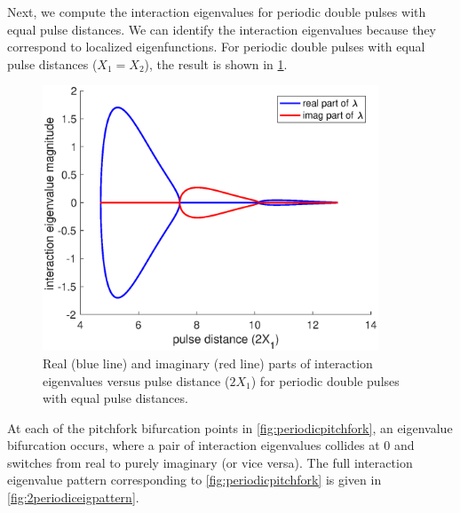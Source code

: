 \documentclass[11pt,reqno]{amsart}
\theoremstyle{plain}
\theoremstyle{definition}
\theoremstyle{remark}
\begin{document}
Next, we compute the interaction eigenvalues for periodic double pulses with equal pulse distances. We can identify the interaction eigenvalues because they correspond to localized eigenfunctions. For periodic double pulses with equal pulse distances ($X_1 = X_2$), the result is shown in \cref{fig:periodicequaleigbif}.
\begin{figure}
\begin{center}
\includegraphics[width=10cm]{images/periodicequaleigbif.eps}
\end{center}
\caption[Eigenvalue bifurcations for symmetric periodic double pulses in KdV5]{Real (blue line) and imaginary (red line) parts of interaction eigenvalues versus pulse distance ($2 X_1$) for periodic double pulses with equal pulse distances.}
\label{fig:periodicequaleigbif}
\end{figure}
At each of the pitchfork bifurcation points in \cref{fig:periodicpitchfork}, an eigenvalue bifurcation occurs, where a pair of interaction eigenvalues collides at 0 and switches from real to purely imaginary (or vice versa). The full interaction eigenvalue pattern corresponding to \cref{fig:periodicpitchfork} is given in \cref{fig:2periodiceigpattern}.
\end{document}
